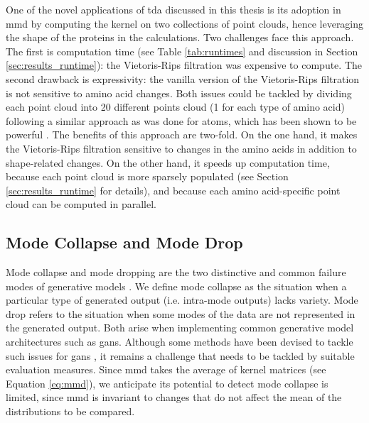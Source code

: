 One of the novel applications of \acrshort{tda} discussed in this thesis is its adoption in
\acrshort{mmd} by computing the kernel on two collections of point clouds, hence leveraging
the shape of the proteins in the calculations. Two challenges face this
approach. The first is computation time (see Table \ref{tab:runtimes} and
discussion in Section \ref{sec:results_runtime}): the Vietoris-Rips filtration
was expensive to compute. The second drawback is expressivity: the vanilla
version of the Vietoris-Rips filtration is not sensitive to amino acid changes.
Both issues could be tackled by dividing each point cloud into 20 different
points cloud (1 for each type of amino acid) following a similar approach as was
done for atoms, which has been shown to be powerful \cite{jiang2021topological}.
The benefits of this approach are two-fold. On the one hand, it makes the
Vietoris-Rips filtration sensitive to changes in the amino acids in addition to
shape-related changes. On the other hand, it
speeds up computation time, because each point cloud is more sparsely populated
(see Section \ref{sec:results_runtime} for details), and because
each amino acid-specific point cloud can be computed in parallel.


\subsection{Mode Collapse and Mode Drop}\label{sec:mode_collapse_mode_drop}

Mode collapse and mode dropping are the two distinctive and common failure modes
of generative models \citep{salimans2016improved}. We define mode collapse as
the situation when a particular type of generated output (i.e. intra-mode
outputs) lacks variety. Mode drop refers to the situation when some modes of the
data are not represented in the generated output. Both arise when implementing
common generative model architectures such as \acrshort{gans}. Although some
methods have been devised to tackle such issues for \acrshort{gans}
\citep{arjovsky2017wasserstein, goodfellow2014generative}, it remains a
challenge that needs to be tackled by suitable evaluation measures. Since
\acrshort{mmd} takes the average of kernel matrices (see Equation \ref{eq:mmd}),
we anticipate its potential to detect mode collapse is limited, since
\acrshort{mmd} is invariant to changes that do not affect the mean of the
distributions to be compared.

